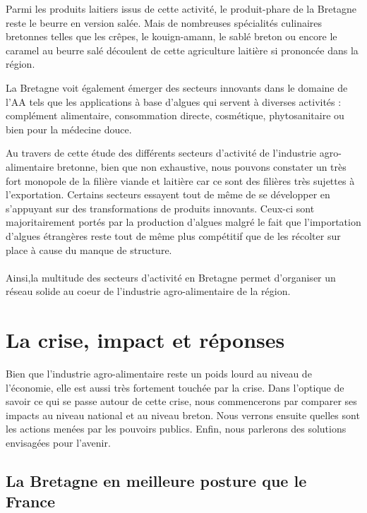 \documentclass[a4paper,12pt]{report}
\begin{document}
			Parmi les produits laitiers issus de cette activité, le produit-phare de la Bretagne reste le beurre en version salée. Mais de nombreuses spécialités culinaires bretonnes telles que les crêpes, le kouign-amann, le sablé breton ou encore le caramel au beurre salé découlent de cette agriculture laitière si prononcée dans la région.
			
			La Bretagne voit également émerger des secteurs innovants dans le domaine de l’AA tels que les applications à base d’algues qui servent à diverses activités\cite{CartesBretagneAgroAlimentaire20142016} : complément alimentaire, consommation directe, cosmétique, phytosanitaire ou bien pour la médecine douce.
			
			Au travers de cette étude des différents secteurs d’activité de l’industrie agro-alimentaire bretonne, bien que non exhaustive, nous pouvons constater un très fort monopole de la filière viande et laitière car ce sont des filières très sujettes à l’exportation. Certains secteurs essayent tout de même de se développer en s’appuyant sur des transformations de produits innovants. Ceux-ci sont majoritairement portés par la production d’algues malgré le fait que l’importation d’algues étrangères reste tout de même plus compétitif que de les récolter sur place à cause du manque de structure.
			
			\paragraph{}Ainsi,la multitude des secteurs d'activité en Bretagne permet d'organiser un réseau solide au coeur de l'industrie agro-alimentaire de la région.
			
			
	\section{La crise, impact et réponses}
		Bien que l'industrie agro-alimentaire reste un poids lourd au niveau de l'économie, elle est aussi très fortement touchée par la crise. Dans l’optique de savoir ce qui se passe autour de cette crise, nous commencerons par comparer ses impacts au niveau national et au niveau breton. Nous verrons ensuite quelles sont les actions menées par les pouvoirs publics. Enfin, nous parlerons des solutions envisagées pour l’avenir.
		
		\subsection{La Bretagne en meilleure posture que le France}
\end{document}
